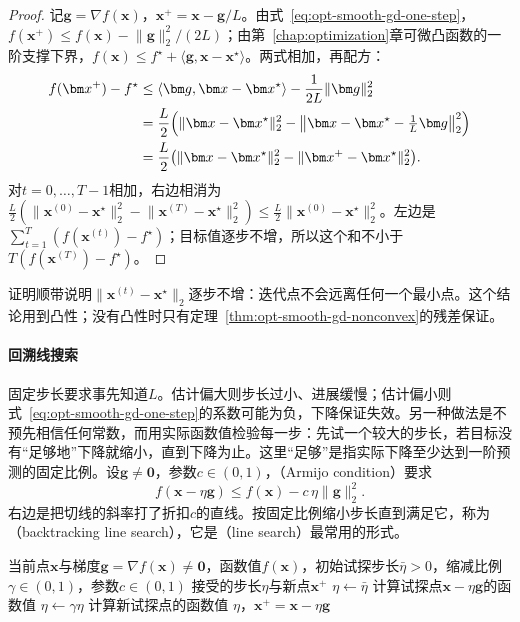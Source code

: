 \begin{proof}
记$\bm g=\nabla f(\bm x)$，$\bm x^+=\bm x-\bm g/L$。由式~\eqref{eq:opt-smooth-gd-one-step}，$f(\bm x^+)\leq f(\bm x)-\lVert\bm g\rVert_2^2/(2L)$；由第~\ref{chap:optimization}章可微凸函数的一阶支撑下界，$f(\bm x)\leq f^\star+\langle\bm g,\bm x-\bm x^\star\rangle$。两式相加，再配方：
\[
  \begin{aligned}
  f(\bm x^+)-f^\star&\leq\langle\bm g,\bm x-\bm x^\star\rangle-\frac1{2L}\lVert\bm g\rVert_2^2\\
  &=\frac L2\Bigl(\lVert\bm x-\bm x^\star\rVert_2^2-\bigl\lVert\bm x-\bm x^\star-\tfrac1L\bm g\bigr\rVert_2^2\Bigr)\\
  &=\frac L2\bigl(\lVert\bm x-\bm x^\star\rVert_2^2-\lVert\bm x^+-\bm x^\star\rVert_2^2\bigr).
  \end{aligned}
\]
对$t=0,\dots,T-1$相加，右边相消为$\tfrac L2(\lVert\bm x^{(0)}-\bm x^\star\rVert_2^2-\lVert\bm x^{(T)}-\bm x^\star\rVert_2^2)\leq\tfrac L2\lVert\bm x^{(0)}-\bm x^\star\rVert_2^2$。左边是$\sum_{t=1}^{T}(f(\bm x^{(t)})-f^\star)$；目标值逐步不增，所以这个和不小于$T(f(\bm x^{(T)})-f^\star)$。
\end{proof}

证明顺带说明$\lVert\bm x^{(t)}-\bm x^\star\rVert_2$逐步不增：迭代点不会远离任何一个最小点。这个结论用到凸性；没有凸性时只有定理~\ref{thm:opt-smooth-gd-nonconvex}的残差保证。

\paragraph{回溯线搜索}
固定步长要求事先知道$L$。估计偏大则步长过小、进展缓慢；估计偏小则式~\eqref{eq:opt-smooth-gd-one-step}的系数可能为负，下降保证失效。另一种做法是不预先相信任何常数，而用实际函数值检验每一步：先试一个较大的步长，若目标没有“足够地”下降就缩小，直到下降为止。这里“足够”是指实际下降至少达到一阶预测的固定比例。设$\bm g\neq\bm0$，参数$c\in(0,1)$，（Armijo condition）要求
\begin{equation}
\label{eq:opt-smooth-armijo}
  f(\bm x-\eta\bm g)\leq f(\bm x)-c\,\eta\lVert\bm g\rVert_2^2 .
\end{equation}
右边是把切线的斜率打了折扣$c$的直线。按固定比例缩小步长直到满足它，称为（backtracking line search），它是（line search）最常用的形式。

\begin{algorithm}[带回溯线搜索的一步梯度下降]
\label{alg:opt-smooth-backtracking}
\begin{algorithmic}[1]
\Require 当前点$\bm x$与梯度$\bm g=\nabla f(\bm x)\neq\bm0$，函数值$f(\bm x)$，初始试探步长$\bar\eta>0$，缩减比例$\gamma\in(0,1)$，参数$c\in(0,1)$
\Ensure 接受的步长$\eta$与新点$\bm x^+$
\State $\eta\gets\bar\eta$
\State 计算试探点$\bm x-\eta\bm g$的函数值
  \State $\eta\gets\gamma\eta$ 
  \State 计算新试探点的函数值
\EndWhile
\State \Return $\eta$，$\bm x^+=\bm x-\eta\bm g$
\end{algorithmic}
\end{algorithm}

